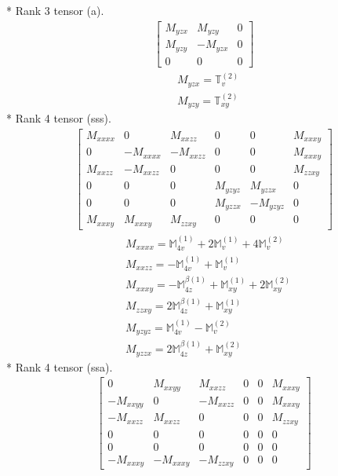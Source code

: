 \documentclass[fleqn,8pt,landscape]{jsarticle}
\begin{document}
* Rank 3 tensor (a).
\begin{align*}
\begin{bmatrix} M_{yzx} & M_{yzy} & 0 \\ M_{yzy} & - M_{yzx} & 0 \\ 0 & 0 & 0 \end{bmatrix}
\end{align*}
\begin{align*}
& M_{yzx} = \mathbb{T}_{v}^{(2)} \\
& M_{yzy} = \mathbb{T}_{xy}^{(2)}
\end{align*}
* Rank 4 tensor (sss).
\begin{align*}
\begin{bmatrix} M_{xxxx} & 0 & M_{xxzz} & 0 & 0 & M_{xxxy} \\ 0 & - M_{xxxx} & - M_{xxzz} & 0 & 0 & M_{xxxy} \\ M_{xxzz} & - M_{xxzz} & 0 & 0 & 0 & M_{zzxy} \\ 0 & 0 & 0 & M_{yzyz} & M_{yzzx} & 0 \\ 0 & 0 & 0 & M_{yzzx} & - M_{yzyz} & 0 \\ M_{xxxy} & M_{xxxy} & M_{zzxy} & 0 & 0 & 0 \end{bmatrix}
\end{align*}
\begin{align*}
& M_{xxxx} = \mathbb{M}_{4v}^{(1)} + 2 \mathbb{M}_{v}^{(1)} + 4 \mathbb{M}_{v}^{(2)} \\
& M_{xxzz} = - \mathbb{M}_{4v}^{(1)} + \mathbb{M}_{v}^{(1)} \\
& M_{xxxy} = - \mathbb{M}_{4z}^{\beta(1)} + \mathbb{M}_{xy}^{(1)} + 2 \mathbb{M}_{xy}^{(2)} \\
& M_{zzxy} = 2 \mathbb{M}_{4z}^{\beta(1)} + \mathbb{M}_{xy}^{(1)} \\
& M_{yzyz} = \mathbb{M}_{4v}^{(1)} - \mathbb{M}_{v}^{(2)} \\
& M_{yzzx} = 2 \mathbb{M}_{4z}^{\beta(1)} + \mathbb{M}_{xy}^{(2)}
\end{align*}
* Rank 4 tensor (ssa).
\begin{align*}
\begin{bmatrix} 0 & M_{xxyy} & M_{xxzz} & 0 & 0 & M_{xxxy} \\ - M_{xxyy} & 0 & - M_{xxzz} & 0 & 0 & M_{xxxy} \\ - M_{xxzz} & M_{xxzz} & 0 & 0 & 0 & M_{zzxy} \\ 0 & 0 & 0 & 0 & 0 & 0 \\ 0 & 0 & 0 & 0 & 0 & 0 \\ - M_{xxxy} & - M_{xxxy} & - M_{zzxy} & 0 & 0 & 0 \end{bmatrix}
\end{align*}
\end{document}
